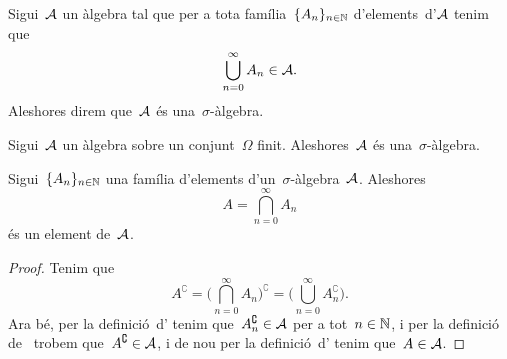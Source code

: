 \documentclass[../Apunts.tex]{subfiles}
\begin{document}
	\begin{definition}
		\label{def:sigma àlgebra}
		Sigui~\(\mathcal{A}\) un àlgebra tal que per a tota família~\(\{A_{n}\}_{n\in\mathbb{N}}\) d'elements~d'\(\mathcal{A}\) tenim que
		\[\bigcup_{n=0}^{\infty}A_{n}\in\mathcal{A}.\]
		Aleshores direm que~\(\mathcal{A}\) és una~\(\sigma\)-àlgebra.
	\end{definition}
	\begin{observation}
		Sigui~\(\mathcal{A}\) un àlgebra sobre un conjunt~\(\Omega\) finit. Aleshores~\(\mathcal{A}\) és una~\(\sigma\)-àlgebra.
	\end{observation}
	\begin{proposition}
		\label{prop:les sigma àlgebras són tancades per interseccions numerables}
		Sigui~\(\{A_{n}\}_{n\in\mathbb{N}}\) una família d'elements d'un~\(\sigma\)-àlgebra~\(\mathcal{A}\). Aleshores
		\[A=\bigcap_{n=0}^{\infty}A_{n}\]
		és un element de~\(\mathcal{A}\).
		\begin{proof}
			Tenim que
			\[A^{\complement}=\Big(\bigcap_{n=0}^{\infty}A_{n}\Big)^{\complement}=\Big(\bigcup_{n=0}^{\infty}A_{n}^{\complement}\Big).\]
			Ara bé, per la definició~d' tenim que~\(A_{n}^{\complement}\in\mathcal{A}\) per a tot~\(n\in\mathbb{N}\), i per la definició de~ trobem que~\(A^{\complement}\in\mathcal{A}\), i de nou per la definició~d' tenim que~\(A\in\mathcal{A}\).
		\end{proof}
	\end{proposition}
\end{document}
